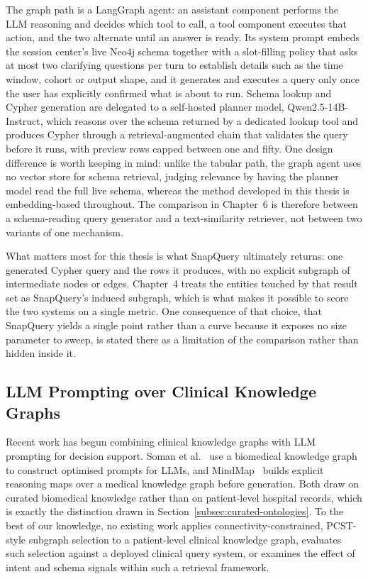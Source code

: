 The graph path is a LangGraph agent: an assistant component performs the LLM
reasoning and decides which tool to call, a tool component executes that action,
and the two alternate until an answer is ready. Its system prompt embeds the
session center's live Neo4j schema together with a slot-filling policy that asks
at most two clarifying questions per turn to establish details such as the time
window, cohort or output shape, and it generates and executes a query only once
the user has explicitly confirmed what is about to run. Schema lookup and Cypher
generation are delegated to a self-hosted planner model, Qwen2.5-14B-Instruct,
which reasons over the schema returned by a dedicated lookup tool and produces
Cypher through a retrieval-augmented chain that validates the query before it
runs, with preview rows capped between one and fifty. One design difference is
worth keeping in mind: unlike the tabular path, the graph agent uses no vector
store for schema retrieval, judging relevance by having the planner model read
the full live schema, whereas the method developed in this thesis is
embedding-based throughout. The comparison in Chapter~6 is therefore between a
schema-reading query generator and a text-similarity retriever, not between two
variants of one mechanism.

What matters most for this thesis is what SnapQuery ultimately returns: one
generated Cypher query and the rows it produces, with no explicit subgraph of
intermediate nodes or edges. Chapter~4 treats the entities touched by that result
set as SnapQuery's induced subgraph, which is what makes it possible to score the
two systems on a single metric. One consequence of that choice, that SnapQuery
yields a single point rather than a curve because it exposes no size parameter to
sweep, is stated there as a limitation of the comparison rather than hidden
inside it.

\subsection{LLM Prompting over Clinical Knowledge Graphs} \label{subsec:llm-clinical-prompting}

Recent work has begun combining clinical knowledge graphs with LLM prompting for
decision support. Soman et al.~\cite{soman2024biomedical} use a biomedical
knowledge graph to construct optimised prompts for LLMs, and
MindMap~\cite{wen2023mindmap} builds explicit reasoning maps over a medical
knowledge graph before generation. Both draw on curated biomedical knowledge
rather than on patient-level hospital records, which is exactly the distinction
drawn in Section~\ref{subsec:curated-ontologies}. To the best of our knowledge,
no existing work applies connectivity-constrained, PCST-style subgraph selection
to a patient-level clinical knowledge graph, evaluates such selection against a
deployed clinical query system, or examines the effect of intent and schema
signals within such a retrieval framework.


